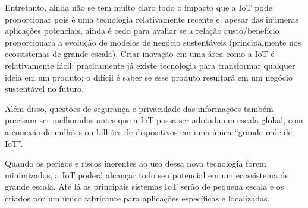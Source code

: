 \documentclass[pdftex, brazil, 12pt, twoside]{article}
\begin{document}
Entretanto, ainda não se tem muito claro todo o impacto que a IoT pode proporcionar
pois é uma tecnologia relativamente recente e, apesar das inúmeras aplicações potenciais,
ainda é cedo para avaliar se a relação custo/benefício proporcionará a evolução de
modelos de negócio sustentáveis (principalmente nos ecossistemas de grande escala).
Criar inovação em uma área como a IoT é relativamente fácil: praticamente já existe tecnologia
para transformar qualquer idéia em um produto; o difícil é saber se esse produto
resultará em um negócio sustentável no futuro.

Além disso, questões de segurança e privacidade das informações também precisam
ser melhoradas antes que a IoT possa ser adotada em escala global, com a
conexão de milhões ou bilhões de dispositivos em uma única ``grande rede de IoT''.

Quando os perigos e riscos inerentes ao uso dessa nova tecnologia forem minimizados,
a IoT poderá alcançar todo seu potencial em um ecossistema de grande escala.
Até lá os principais sistemas IoT serão de pequena escala e os criados por um único
fabricante para aplicações específicas e localizadas.



\end{document}
